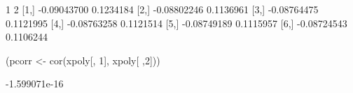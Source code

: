 \begin{Schunk}
\begin{Soutput}
               1         2
[1,] -0.09043700 0.1234184
[2,] -0.08802246 0.1136961
[3,] -0.08764475 0.1121995
[4,] -0.08763258 0.1121514
[5,] -0.08749189 0.1115957
[6,] -0.08724543 0.1106244
\end{Soutput}
\begin{Sinput}
 (pcorr <- cor(xpoly[, 1], xpoly[ ,2]))
\end{Sinput}
\begin{Soutput}
[1] -1.599071e-16
\end{Soutput}
\end{Schunk}
